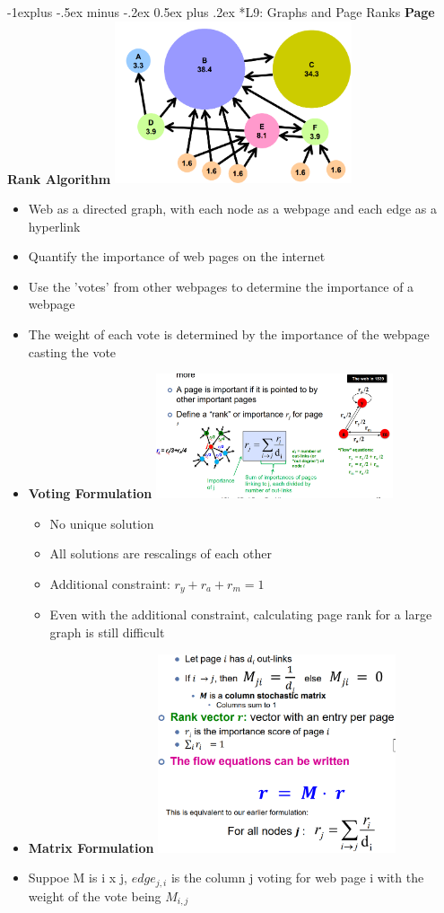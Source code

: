 \documentclass[10pt, landscape]{article}
\makeatletter
\renewcommand{\subsection}{\@startsection{subsection}{2}{0mm}%
                                {-1explus -.5ex minus -.2ex}%
                                {0.5ex plus .2ex}%
                                {\normalfont\normalsize\bfseries}}
\makeatother
\begin{document}
\begin{multicols}{4}
\subsection*{L9: Graphs and Page Ranks}
\textbf{Page Rank Algorithm}
\includegraphics*[width=7cm]{page_rank.png}
\begin{itemize}
  \item Web as a directed graph, with each node as a webpage and each edge as a hyperlink
  \item Quantify the importance of web pages on the internet
  \item Use the 'votes' from other webpages to determine the importance of a webpage
  \item The weight of each vote is determined by the importance of the webpage casting the vote
  \item \textbf{Voting Formulation}
  \includegraphics*[width=7cm]{page_rank_formulation.png}
  \begin{itemize}
    \item No unique solution
    \item All solutions are rescalings of each other 
    \item Additional constraint: $r_y + r_a + r_m = 1$
    \item Even with the additional constraint, calculating page rank for a large graph is still difficult
  \end{itemize}
  \item \textbf{Matrix Formulation}
  \includegraphics*[width=7cm]{flow eqn.png}
  \item Suppoe M is i x j, $edge_{j,i}$ is the column j voting for web page i with the weight of the vote being $M_{i,j}$
\end{itemize}


\end{multicols}
\end{document}

